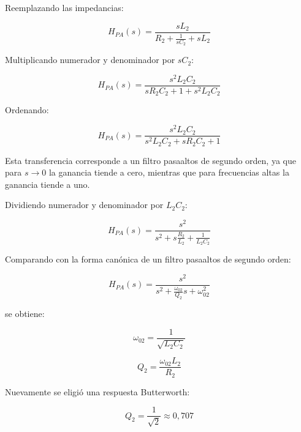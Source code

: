\documentclass[12pt,a4paper]{article}
\begin{document}
Reemplazando las impedancias:

\begin{equation}
    H_{PA}(s)=
    \frac{sL_2}
    {R_2+\frac{1}{sC_2}+sL_2}
    \label{eq:hpa_intermedia}
\end{equation}

Multiplicando numerador y denominador por $sC_2$:

\begin{equation}
    H_{PA}(s)=
    \frac{s^2L_2C_2}
    {sR_2C_2+1+s^2L_2C_2}
    \label{eq:hpa}
\end{equation}

Ordenando:

\begin{equation}
    \boxed{
    H_{PA}(s)=
    \frac{s^2L_2C_2}
    {s^2L_2C_2+sR_2C_2+1}
    }
    \label{eq:hpa_final}
\end{equation}

Esta transferencia corresponde a un filtro pasaaltos de segundo orden, ya que para $s\to 0$ la ganancia tiende a cero, mientras que para frecuencias altas la ganancia tiende a uno.

Dividiendo numerador y denominador por $L_2C_2$:

\begin{equation}
    H_{PA}(s)=
    \frac{s^2}
    {s^2+s\frac{R_2}{L_2}+\frac{1}{L_2C_2}}
    \label{eq:hpa_normalizada}
\end{equation}

Comparando con la forma canónica de un filtro pasaaltos de segundo orden:

\begin{equation}
    H_{PA}(s)=
    \frac{s^2}
    {s^2+\frac{\omega_{02}}{Q_2}s+\omega_{02}^2}
    \label{eq:hpa_canonica}
\end{equation}

se obtiene:

\begin{equation}
    \boxed{
    \omega_{02}=\frac{1}{\sqrt{L_2C_2}}
    }
    \label{eq:w02}
\end{equation}

\begin{equation}
    \boxed{
    Q_2=\frac{\omega_{02}L_2}{R_2}
    }
    \label{eq:q2}
\end{equation}

Nuevamente se eligió una respuesta Butterworth:

\begin{equation}
    Q_2=\frac{1}{\sqrt{2}}\approx 0{,}707
    \label{eq:q_butterworth_pa}
\end{equation}
\end{document}
